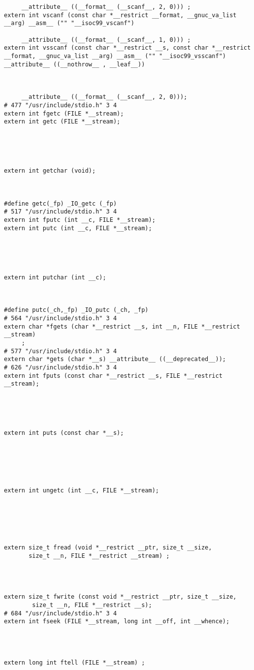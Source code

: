 \documentclass[11pt]{article}
\begin{document}
\begin{enumerate}
\begin{verbatim}
     __attribute__ ((__format__ (__scanf__, 2, 0))) ;
extern int vscanf (const char *__restrict __format, __gnuc_va_list __arg) __asm__ ("" "__isoc99_vscanf")

     __attribute__ ((__format__ (__scanf__, 1, 0))) ;
extern int vsscanf (const char *__restrict __s, const char *__restrict __format, __gnuc_va_list __arg) __asm__ ("" "__isoc99_vsscanf") __attribute__ ((__nothrow__ , __leaf__))



     __attribute__ ((__format__ (__scanf__, 2, 0)));
# 477 "/usr/include/stdio.h" 3 4
extern int fgetc (FILE *__stream);
extern int getc (FILE *__stream);





extern int getchar (void);



#define getc(_fp) _IO_getc (_fp)
# 517 "/usr/include/stdio.h" 3 4
extern int fputc (int __c, FILE *__stream);
extern int putc (int __c, FILE *__stream);





extern int putchar (int __c);



#define putc(_ch,_fp) _IO_putc (_ch, _fp)
# 564 "/usr/include/stdio.h" 3 4
extern char *fgets (char *__restrict __s, int __n, FILE *__restrict __stream)
     ;
# 577 "/usr/include/stdio.h" 3 4
extern char *gets (char *__s) __attribute__ ((__deprecated__));
# 626 "/usr/include/stdio.h" 3 4
extern int fputs (const char *__restrict __s, FILE *__restrict __stream);





extern int puts (const char *__s);






extern int ungetc (int __c, FILE *__stream);






extern size_t fread (void *__restrict __ptr, size_t __size,
       size_t __n, FILE *__restrict __stream) ;




extern size_t fwrite (const void *__restrict __ptr, size_t __size,
        size_t __n, FILE *__restrict __s);
# 684 "/usr/include/stdio.h" 3 4
extern int fseek (FILE *__stream, long int __off, int __whence);




extern long int ftell (FILE *__stream) ;





\end{verbatim}
\end{enumerate}
\end{document}
